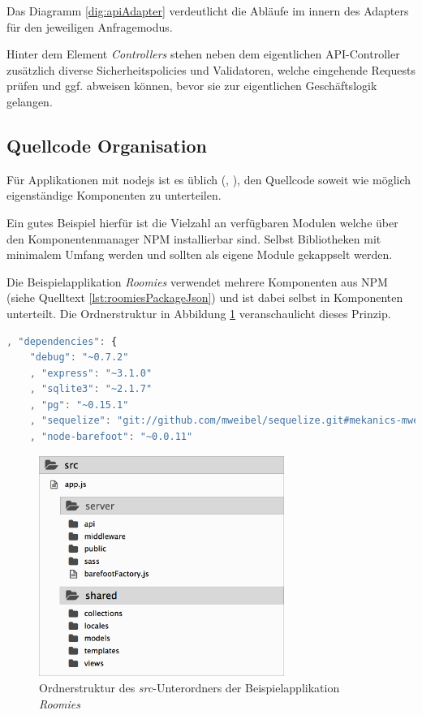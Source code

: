 Das Diagramm \ref{dig:apiAdapter} verdeutlicht die Abläufe im innern des Adapters für den jeweiligen Anfragemodus.

Hinter dem Element \emph{Controllers} stehen neben dem eigentlichen API-Controller zusätzlich diverse Sicherheitspolicies und Validatoren, welche eingehende Requests prüfen und ggf. abweisen können, bevor sie zur eigentlichen Geschäftslogik gelangen.



\newpage

\subsection{Quellcode Organisation}
Für Applikationen mit \gls{nodejs} ist es üblich (\cite{TJH_ComponentStructure}, \cite{IZS_ComponentStructure}), den Quellcode soweit wie möglich eigenständige Komponenten zu unterteilen.

Ein gutes Beispiel hierfür ist die Vielzahl an verfügbaren Modulen welche über den Komponentenmanager NPM \cite{NPM} installierbar sind. Selbst Bibliotheken mit minimalem Umfang werden und sollten als eigene Module gekappselt werden.

Die Beispielapplikation \emph{Roomies} verwendet mehrere Komponenten aus NPM (siehe Quelltext \ref{lst:roomiesPackageJson}) und ist dabei selbst in Komponenten unterteilt. Die Ordnerstruktur in Abbildung \ref{fig:roomiesFolderStructure} veranschaulicht dieses Prinzip.

\begin{lstlisting}[language=JavaScript, firstnumber=9, caption={Auszug der verwendeten NPM Komponenten \cite{RoomiesPackageJson}}, label={lst:roomiesPackageJson}, float=ht!]
, "dependencies": {
	"debug": "~0.7.2"
	, "express": "~3.1.0"
	, "sqlite3": "~2.1.7"
	, "pg": "~0.15.1"
	, "sequelize": "git://github.com/mweibel/sequelize.git#mekanics-mweibel-fix"
	, "node-barefoot": "~0.0.11"
\end{lstlisting}

\begin{figure}[H]
	\centering
	\includegraphics[width=8cm]{content/sad/images/folder-structure.png}
	\caption{Ordnerstruktur des \emph{src}-Unterordners der Beispielapplikation \emph{Roomies}}
	\label{fig:roomiesFolderStructure}
\end{figure}

